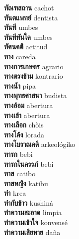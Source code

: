 \textbf{ ทัณฑสถาน  } cachot \\
\textbf{ ทันตแพทย์  } dentista \\
\textbf{ ทันที  } umbes \\
\textbf{ ทันทีทันใด  } umbes \\
\textbf{ ทัศนคติ  } actitud \\
\textbf{ ทาง  } careda \\
\textbf{ ทางการเกษตร  } agrario \\
\textbf{ ทางตรงข้าม  } kontrario \\
\textbf{ ทางน้ำ  } pipa \\
\textbf{ ทางพุทธศาสนา  } budista \\
\textbf{ ทางอ้อม  } abertura \\
\textbf{ ทางเข้า  } abertura \\
\textbf{ ทางเลือก  } chòis \\
\textbf{ ทางโค้ง  } lorada \\
\textbf{ ทางโบราณคดี  } arkeológiko \\
\textbf{ ทารก  } bebi \\
\textbf{ ทารกในครรภ์  } bebi \\
\textbf{ ทาส  } catibo \\
\textbf{ ทาสหญิง  } katibu \\
\textbf{ ทำ  } krea \\
\textbf{ ทำกับข้าว  } kushiná \\
\textbf{ ทำความสะอาด  } limpia \\
\textbf{ ทำความเข้าใจ  } konvensé \\
\textbf{ ทำความเสียหาย  } daña \\

